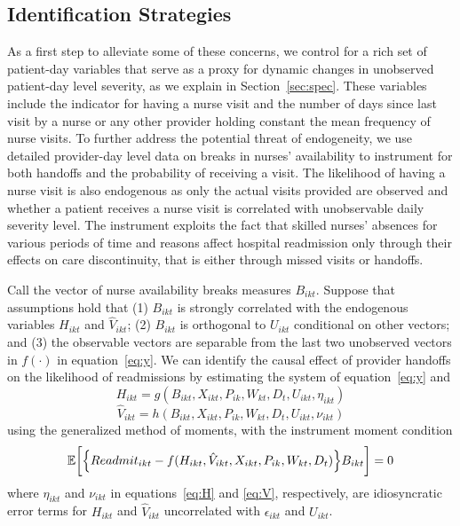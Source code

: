 \documentclass[final,12pt, notitlepage]{article}
\begin{document}
\subsection{Identification Strategies} \label{sec:id_strategies}
As a first step to alleviate some of these concerns, we control for a rich set of patient-day variables that serve as a proxy for dynamic changes in unobserved patient-day level severity, as we explain in Section~\ref{sec:spec}.
These variables include the indicator for having a nurse visit and the number of days since last visit by a nurse or any other provider holding constant the mean frequency of nurse visits.
To further address the potential threat of endogeneity, we use detailed provider-day level data on breaks in nurses' availability to instrument for both handoffs and the probability of receiving a visit. The likelihood of having a nurse visit is also endogenous as only the actual visits provided are observed and whether a patient receives a nurse visit is correlated with unobservable daily severity level.
The instrument exploits the fact that skilled nurses' absences for various periods of time and reasons affect hospital readmission only through their effects on care discontinuity, that is either through missed visits or handoffs.

Call the vector of nurse availability breaks measures $B_{ikt}$.
Suppose that assumptions hold that (1) $B_{ikt}$ is strongly correlated with the endogenous variables $H_{ikt}$ and $\hat{V}_{ikt}$;
(2) $B_{ikt}$ is orthogonal to $U_{ikt}$ conditional on other vectors; and
(3) the observable vectors are separable from the last two unobserved vectors in $f(\cdot)$ in equation~\eqref{eq:y}.
We can identify the causal effect of provider handoffs on the likelihood of readmissions by estimating the system of equation~\eqref{eq:y} and
\begin{equation}\label{eq:H}
H_{ikt} = g( B_{ikt} , X_{ikt}, P_{ik}, W_{kt}, D_t, U_{ikt}, \eta_{ikt})
\end{equation}
 \begin{equation}\label{eq:V}
\hat{V}_{ikt} = h( B_{ikt} , X_{ikt}, P_{ik}, W_{kt}, D_t, U_{ikt}, \nu_{ikt})
\end{equation}
using the generalized method of moments, with the instrument moment condition
\begin{equation}
\mathbb{E} \bigg[ \Big\{ Readmit_{ikt} - f(H_{ikt}, \hat{V}_{ikt}, X_{ikt}, P_{ik}, W_{kt}, D_t ) \Big\} B_{ikt}  \bigg] = 0
\end{equation}
where $\eta_{ikt}$ and $\nu_{ikt}$ in equations~\eqref{eq:H} and \eqref{eq:V}, respectively, are idiosyncratic error terms for $H_{ikt}$ and $\hat{V}_{ikt}$ uncorrelated with $\epsilon_{ikt}$ and $U_{ikt}$.
\end{document}
